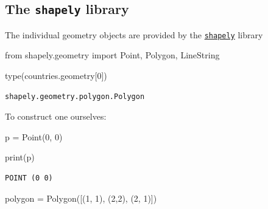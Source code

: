 \documentclass[
  letterpaper,
  DIV=11,
  numbers=noendperiod]{scrreprt}
\newenvironment{Shaded}{\begin{snugshade}}{\end{snugshade}}
\newcommand{\BuiltInTok}[1]{\textcolor[rgb]{0.00,0.23,0.31}{#1}}
\newcommand{\DecValTok}[1]{\textcolor[rgb]{0.68,0.00,0.00}{#1}}
\newcommand{\ImportTok}[1]{\textcolor[rgb]{0.00,0.46,0.62}{#1}}
\newcommand{\NormalTok}[1]{\textcolor[rgb]{0.00,0.23,0.31}{#1}}
\newcommand{\OperatorTok}[1]{\textcolor[rgb]{0.37,0.37,0.37}{#1}}
\begin{document}
\subsection{\texorpdfstring{The \texttt{shapely}
library}{The shapely library}}\label{the-shapely-library}

The individual geometry objects are provided by the
\href{https://shapely.readthedocs.io/en/stable/}{\texttt{shapely}}
library

\begin{Shaded}
\begin{Highlighting}[]
\ImportTok{from}\NormalTok{ shapely.geometry }\ImportTok{import}\NormalTok{ Point, Polygon, LineString}
\end{Highlighting}
\end{Shaded}

\begin{Shaded}
\begin{Highlighting}[]
\BuiltInTok{type}\NormalTok{(countries.geometry[}\DecValTok{0}\NormalTok{])}
\end{Highlighting}
\end{Shaded}

\begin{verbatim}
shapely.geometry.polygon.Polygon
\end{verbatim}

To construct one ourselves:

\begin{Shaded}
\begin{Highlighting}[]
\NormalTok{p }\OperatorTok{=}\NormalTok{ Point(}\DecValTok{0}\NormalTok{, }\DecValTok{0}\NormalTok{)}
\end{Highlighting}
\end{Shaded}

\begin{Shaded}
\begin{Highlighting}[]
\BuiltInTok{print}\NormalTok{(p)}
\end{Highlighting}
\end{Shaded}

\begin{verbatim}
POINT (0 0)
\end{verbatim}

\begin{Shaded}
\begin{Highlighting}[]
\NormalTok{polygon }\OperatorTok{=}\NormalTok{ Polygon([(}\DecValTok{1}\NormalTok{, }\DecValTok{1}\NormalTok{), (}\DecValTok{2}\NormalTok{,}\DecValTok{2}\NormalTok{), (}\DecValTok{2}\NormalTok{, }\DecValTok{1}\NormalTok{)])}
\end{Highlighting}
\end{Shaded}
\end{document}
